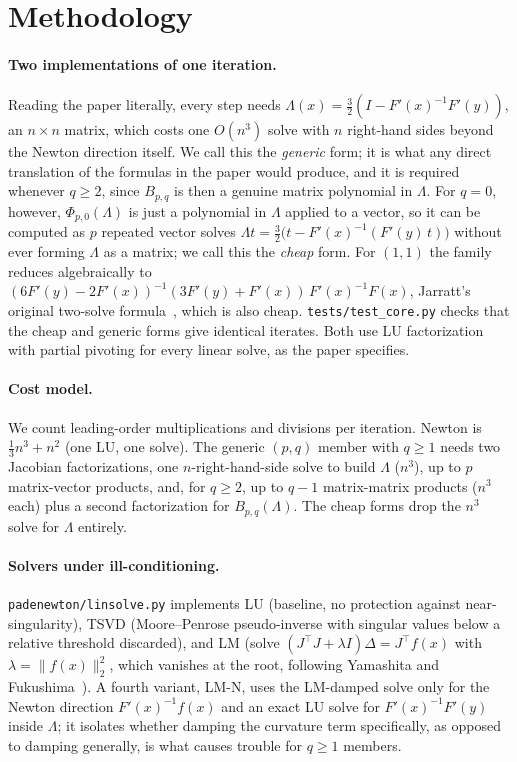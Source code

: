 \documentclass[sigconf,nonacm]{acmart}
\begin{document}
\section{Methodology}

\paragraph{Two implementations of one iteration.}
Reading the paper literally, every step needs $\Lambda(x)=\tfrac32(I-F'(x)^{-1}F'(y))$, an
$n\times n$ matrix, which costs one $O(n^3)$ solve with $n$ right-hand sides beyond the Newton
direction itself. We call this the \emph{generic} form; it is what any direct translation of
the formulas in the paper would produce, and it is required whenever $q\ge2$, since $B_{p,q}$
is then a genuine matrix polynomial in $\Lambda$. For $q=0$, however, $\Phi_{p,0}(\Lambda)$ is
just a polynomial in $\Lambda$ applied to a vector, so it can be computed as $p$ repeated
vector solves $\Lambda t=\tfrac32\big(t-F'(x)^{-1}(F'(y)\,t)\big)$ without ever forming
$\Lambda$ as a matrix; we call this the \emph{cheap} form. For $(1,1)$ the family reduces
algebraically to $(6F'(y)-2F'(x))^{-1}(3F'(y)+F'(x))\,F'(x)^{-1}F(x)$, Jarratt's original
two-solve formula~\cite{jarratt1966}, which is also cheap. \texttt{tests/test\_core.py} checks
that the cheap and generic forms give identical iterates. Both use LU factorization with
partial pivoting for every linear solve, as the paper specifies.

\paragraph{Cost model.} We count leading-order multiplications and divisions per iteration.
Newton is $\tfrac13n^3+n^2$ (one LU, one solve). The generic $(p,q)$ member with $q\ge1$ needs
two Jacobian factorizations, one $n$-right-hand-side solve to build $\Lambda$ ($n^3$), up to
$p$ matrix-vector products, and, for $q\ge2$, up to $q-1$ matrix-matrix products ($n^3$ each)
plus a second factorization for $B_{p,q}(\Lambda)$. The cheap forms drop the $n^3$ solve for
$\Lambda$ entirely.

\paragraph{Solvers under ill-conditioning.} \texttt{padenewton/linsolve.py} implements
LU (baseline, no protection against near-singularity), TSVD (Moore--Penrose pseudo-inverse with
singular values below a relative threshold discarded), and LM
(solve $(J^\top J+\lambda I)\Delta=J^\top f(x)$ with $\lambda=\|f(x)\|_2^2$, which vanishes at
the root, following Yamashita and Fukushima~\cite{yamashita2001}). A fourth variant, LM-N, uses
the LM-damped solve only for the Newton direction $F'(x)^{-1}f(x)$ and an exact LU solve for
$F'(x)^{-1}F'(y)$ inside $\Lambda$; it isolates whether damping the curvature term specifically,
as opposed to damping generally, is what causes trouble for $q\ge1$ members.
\end{document}
